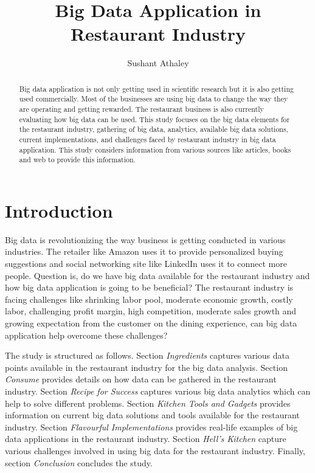 \documentclass[sigconf]{acmart}
\begin{document}
\title{Big Data Application in Restaurant Industry}


\author{Sushant Athaley}



\begin{abstract}
Big data application is not only getting used in scientific research but it is also getting used commercially. Most of the businesses are using big data to change the way they are operating and getting rewarded. The restaurant business is also currently evaluating how big data can be used. This study focuses on the big data elements for the restaurant industry, gathering of big data, analytics, available big data solutions, current implementations, and challenges faced by restaurant industry in big data application. This study considers information from various sources like articles, books and web to provide this information.
\end{abstract}



\maketitle

\section{Introduction}
Big data is revolutionizing the way business is getting conducted in various industries. The retailer like Amazon uses it to provide personalized buying suggestions and social networking site like LinkedIn uses it to connect more people. Question is, do we have big data available for the restaurant industry and how big data application is going to be beneficial? The restaurant industry is facing challenges like shrinking labor pool, moderate economic growth, costly labor, challenging profit margin, high competition, moderate sales growth and growing expectation from the customer on the dining experience, can big data application help overcome these challenges? \cite{www-restaurant-challenges}

The study is structured as follows. Section {\em Ingredients} captures various data points available in the restaurant industry for the big data analysis. Section {\em Consume} provides details on how data can be gathered in the restaurant industry. Section {\em Recipe for Success} captures various big data analytics which can help to solve different problems. Section {\em Kitchen Tools and Gadgets} provides information on current big data solutions and tools available for the restaurant industry. Section {\em Flavourful Implementations} provides real-life examples of big data applications in the restaurant industry. Section {\em Hell's Kitchen} capture various challenges involved in using big data for the restaurant industry. Finally, section {\em Conclusion} concludes the study.
\end{document}

